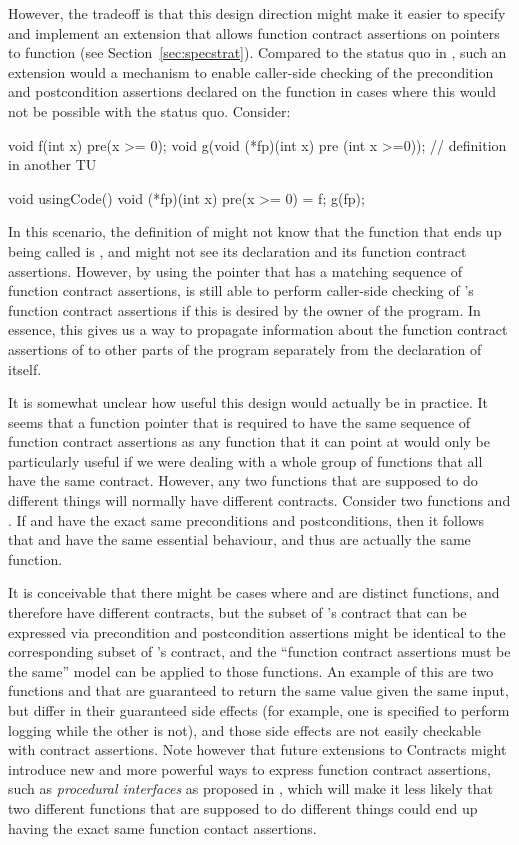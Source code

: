 However, the tradeoff is that  this design direction might make it easier to specify and implement an extension that allows function contract assertions on pointers to function (see Section~\ref{sec:specstrat}). Compared to the status quo in \cite{P2900R7}, such an extension would a mechanism to enable caller-side checking of the precondition and postcondition assertions declared on the function in cases where this would not be possible with the status quo. Consider:
\begin{codeblock}
void f(int x) pre(x >= 0);
void g(void (*fp)(int x) pre (int x >=0)); // definition in another TU

void usingCode() {
   void (*fp)(int x) pre(x >= 0) = f;
   g(fp);
}
\end{codeblock}
In this scenario, the definition of  might not know that the function that ends up being called is , and might not see its declaration and its function contract assertions. However, by using the pointer  that has a matching sequence of function contract assertions,  is still able to perform caller-side checking of 's function contract assertions if this is desired by the owner of the program. In essence, this gives us a way to propagate information about the function contract assertions of  to other parts of the program separately from the declaration of  itself.

It is somewhat unclear how useful this design would actually be in practice. It seems that a function pointer that is required to have the same sequence of function contract assertions as any function that it can point at would only be particularly useful if we were dealing with a whole group of functions that all have the same contract. However, any two functions that are supposed to do different things will normally have different contracts. Consider two functions  and . If  and  have the exact same preconditions and postconditions, then it follows that  and  have the same essential behaviour, and thus are actually the same function.

It is conceivable that there might be cases where  and  are distinct functions, and therefore have different contracts, but the subset of 's contract that can be expressed via precondition and postcondition assertions might be identical to the corresponding subset of 's contract, and the ``function contract assertions must be the same'' model can be applied to those functions. An example of this are two functions  and  that are guaranteed to return the same value given the same input, but differ in their guaranteed side effects (for example, one is specified to perform logging while the other is not), and those side effects are not easily checkable with contract assertions. Note however that future extensions to Contracts might introduce new and more powerful ways to express function contract assertions, such as \emph{procedural interfaces} as proposed in \cite{P0465R0}, which will make it less likely that two different functions that are supposed to do different things could end up having the exact same function contact assertions.

